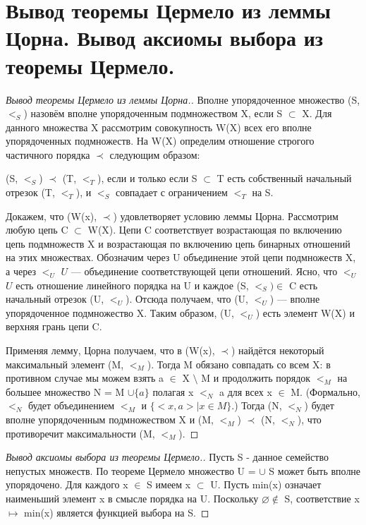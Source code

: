 \section{Вывод теоремы Цермело из леммы Цорна. Вывод аксиомы выбора из теоремы Цермело.}

\begin{proof}[Вывод теоремы Цермело из леммы Цорна.]
	Вполне упорядоченное множество (S, $<_S$) назовём вполне упорядоченным подмножеством X, если S $\subset$ X. Для
	данного множества X рассмотрим совокупность W(X) всех его вполне упорядоченных подмножеств. На W(X) определим
	отношение строгого частичного порядка $\prec$ следующим образом:

	\begin{center}
		(S, $<_S$) $\prec$ (T, $<_T$), если и только если S $\subset$ T есть собственный начальный отрезок (T,
		$<_T$), и $<_S$ совпадает с ограничением $<_T$ на S. 
	\end{center}

	Докажем, что (W(x), $\prec$) удовлетворяет условию леммы Цорна. Рассмотрим любую цепь C $\subset$ W(X).  Цепи C
	соответствует возрастающая по включению цепь подмножеств X и возрастающая по включению цепь бинарных отношений
	на этих множествах. Обозначим через U объединение этой цепи подмножеств X, а через $<_U$ $U$ — объединение
	соответствующей цепи отношений. Ясно, что $<_U$ $U$ есть отношение линейного порядка на U и каждое (S, $<_S)
	\in$ C есть начальный отрезок (U, $<_U$). Отсюда получаем, что (U, $<_U$) — вполне упорядоченное подмножество
	X. Таким образом, (U, $<_U$) есть элемент W(X) и верхняя грань цепи C.

	Применяя лемму, Цорна получаем, что в (W(x), $\prec$) найдётся некоторый максимальный элемент (M, $<_M$). Тогда
	M обязано совпадать со всем X: в противном случае мы можем взять a $\in$ X $\setminus$ M и продолжить порядок
	$<_M$ на большее множество N = M $\cup \{ a \}$ полагая x $<_N$ a для всех x $\in$ M.  (Формально, $<_N$ будет
	объединением $<_M$ и $\{ <x,a> \mid x \in M \}$.) Тогда (N, $<_N$) будет вполне упорядоченным подмножеством X и
	(M, $<_M$) $\prec$ (N, $<_N$), что противоречит максимальности (M, $<_M$).
\end{proof}

\begin{proof}[Вывод аксиомы выбора из теоремы Цермело.]
	Пусть S - данное семейство непустых множеств. По теореме Цермело множество U = $\cup$ S может быть вполне
	упорядочено. Для каждого  x $\in$ S имеем x $\subset$ U. Пусть min(x) означает наименьший элемент x в смысле
	порядка на U. Поскольку $\varnothing \notin$ S, соответствие x $\mapsto$ min(x) является функцией выбора на S.
\end{proof}
